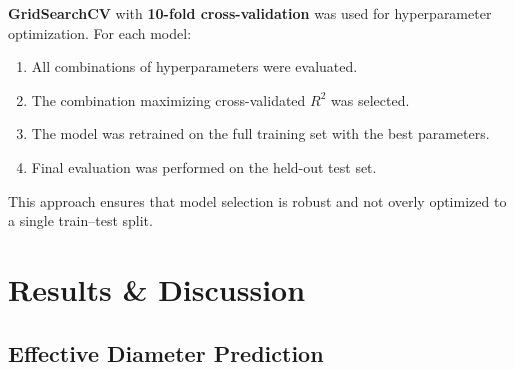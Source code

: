 \documentclass[12pt, a4paper]{article}
\begin{document}
\textbf{GridSearchCV} with \textbf{10-fold cross-validation} was used for hyperparameter optimization. For each model:

\begin{enumerate}
    \item All combinations of hyperparameters were evaluated.
    \item The combination maximizing cross-validated $R^2$ was selected.
    \item The model was retrained on the full training set with the best parameters.
    \item Final evaluation was performed on the held-out test set.
\end{enumerate}

This approach ensures that model selection is robust and not overly optimized to a single train--test split.

\section{Results \& Discussion}
\label{sec:results}

\subsection{Effective Diameter Prediction}
\label{sec:diameter-results}

\begin{table}[H]
\centering
\caption{Model comparison for effective diameter prediction. Best values in \textbf{bold}.}
\label{tab:diameter-results}
\end{table}
\end{document}
